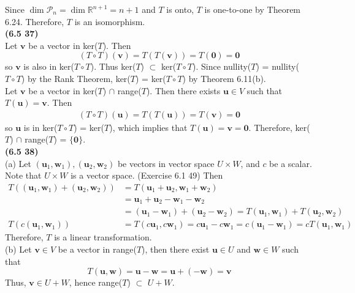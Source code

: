 Since $\dim \mathscr{P}_n = \dim \mathbb{R}^{n+1} = n+1$ and $T$ is onto, $T$ is one-to-one by Theorem 6.24. Therefore, $T$ is an isomorphism. \\

\textbf{(6.5 37)} \\
Let $\textbf{v}$ be a vector in ker($T$). Then \begin{equation*}
	(T \circ T)(\textbf{v}) = T(T(\textbf{v})) = T(\textbf{0}) = \textbf{0}
\end{equation*} so $\textbf{v}$ is also in ker($T \circ T$). Thus ker($T$) $\subset$ ker($T \circ T$). Since nullity($T$) = nullity($T \circ T$) by the Rank Theorem, ker($T$) = ker($T \circ T$) by Theorem 6.11(b). \\

Let $\textbf{v}$ be a vector in ker($T$) $\cap$ range($T$). Then there exists $\textbf{u} \in V$ such that $T(\textbf{u}) = \textbf{v}$. Then \begin{align*}
	(T \circ T)(\textbf{u})  = T(T(\textbf{u})) = T(\textbf{v}) = \textbf{0}
\end{align*} so $\textbf{u}$ is in ker($T \circ T$) = ker($T$), which implies that $T(\textbf{u}) = \textbf{v} = \textbf{0}$. Therefore, ker($T$) $\cap$ range($T$) = $\{\textbf{0}\}$. \\

\textbf{(6.5 38)} \\
(a) Let $(\textbf{u}_1, \textbf{w}_1), (\textbf{u}_2, \textbf{w}_2)$ be vectors in vector space $U \times W$, and $c$ be a scalar. Note that $U \times W$ is a vector space. (Exercise 6.1 49) Then \begin{align*}
	T((\textbf{u}_1, \textbf{w}_1) + (\textbf{u}_2, \textbf{w}_2)) &= T(\textbf{u}_1 + \textbf{u}_2, \textbf{w}_1 + \textbf{w}_2) \\
	&= \textbf{u}_1 + \textbf{u}_2 - \textbf{w}_1 - \textbf{w}_2 \\
	&= (\textbf{u}_1 - \textbf{w}_1) + (\textbf{u}_2 - \textbf{w}_2) = T(\textbf{u}_1, \textbf{w}_1) + T(\textbf{u}_2, \textbf{w}_2) \\
	T(c(\textbf{u}_1, \textbf{w}_1)) &= T(c\textbf{u}_1, c\textbf{w}_1) = c\textbf{u}_1 - c\textbf{w}_1 = c(\textbf{u}_1 - \textbf{w}_1) = cT(\textbf{u}_1, \textbf{w}_1)
\end{align*} Therefore, $T$ is a linear transformation. \\

(b) Let $\textbf{v} \in V$ be a vector in range($T$), then there exist $\textbf{u} \in U$ and $\textbf{w} \in W$ such that \begin{equation*}
	T(\textbf{u}, \textbf{w}) = \textbf{u} - \textbf{w} = \textbf{u} + (-\textbf{w}) = \textbf{v}
\end{equation*} Thus, $\textbf{v} \in U + W$, hence range($T$) $\subset$ $U + W$. \\

